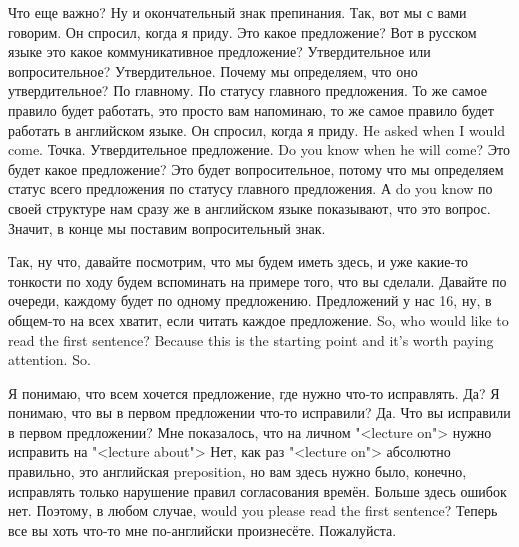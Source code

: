 \documentclass[main.tex]{subfiles}
\begin{document}
Что еще важно?
Ну и окончательный знак препинания.
Так, вот мы с вами говорим.
Он спросил, когда я приду.
Это какое предложение?
Вот в русском языке это какое коммуникативное предложение?
Утвердительное или вопросительное?
Утвердительное.
Почему мы определяем, что оно утвердительное?
По главному.
По статусу главного предложения.
То же самое правило будет работать, это просто вам напоминаю, то же самое правило будет работать в английском языке.
Он спросил, когда я приду.
He asked when I would come.
Точка. Утвердительное предложение.
Do you know when he will come?
Это будет какое предложение?
Это будет вопросительное, потому что мы определяем статус всего предложения по статусу главного предложения.
А do you know по своей структуре нам сразу же в английском языке показывают, что это вопрос.
Значит, в конце мы поставим вопросительный знак.

Так, ну что, давайте посмотрим, что мы будем иметь здесь, и уже какие-то тонкости по ходу будем вспоминать на примере того, что вы сделали.
Давайте по очереди, каждому будет по одному предложению.
Предложений у нас 16, ну, в общем-то на всех хватит, если читать каждое предложение.
So, who would like to read the first sentence?
Because this is the starting point and it's worth paying attention.
So.

Я понимаю, что всем хочется предложение, где нужно что-то исправлять.
Да?
Я понимаю, что вы в первом предложении что-то исправили?
Да.
Что вы исправили в первом предложении?
Мне показалось, что на личном "<lecture on"> нужно исправить на "<lecture about">
Нет, как раз "<lecture on"> абсолютно правильно, это английская preposition, но вам здесь нужно было, конечно, исправлять только нарушение правил согласования времён.
Больше здесь ошибок нет.
Поэтому, в любом случае, would you please read the first sentence?
Теперь все вы хоть что-то мне по-английски произнесёте.
Пожалуйста.
\end{document}
